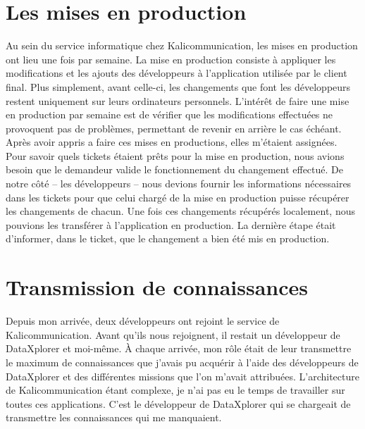 \section{Les mises en production}
Au sein du service informatique chez Kalicommunication, les mises en production ont lieu une fois par semaine. La mise en production consiste à appliquer les modifications et les ajouts des développeurs à l'application utilisée par le client final. Plus simplement, avant celle-ci, les changements que font les développeurs restent uniquement sur leurs ordinateurs personnels. L'intérêt de faire une mise en production par semaine est de vérifier que les modifications effectuées ne provoquent pas de problèmes, permettant de revenir en arrière le cas échéant.\newline
Après avoir appris a faire ces mises en productions, elles m'étaient assignées. Pour savoir quels tickets étaient prêts pour la mise en production, nous avions besoin que le demandeur valide le fonctionnement du changement effectué. De notre côté -- les développeurs -- nous devions fournir les informations nécessaires dans les tickets pour que celui chargé de la mise en production puisse récupérer les changements de chacun. Une fois ces changements récupérés localement, nous pouvions les transférer à l'application en production. La dernière étape était d'informer, dans le ticket, que le changement a bien été mis en production.

\section{Transmission de connaissances}
Depuis mon arrivée, deux développeurs ont rejoint le service de Kalicommunication. Avant qu'ils nous rejoignent, il restait un développeur de DataXplorer et moi-même. À chaque arrivée, mon rôle était de leur transmettre le maximum de connaissances que j'avais pu acquérir à l'aide des développeurs de DataXplorer et des différentes missions que l'on m'avait attribuées. L'architecture de Kalicommunication étant complexe, je n'ai pas eu le temps de travailler sur toutes ces applications. C'est le développeur de DataXplorer qui se chargeait de transmettre les connaissances qui me manquaient.

